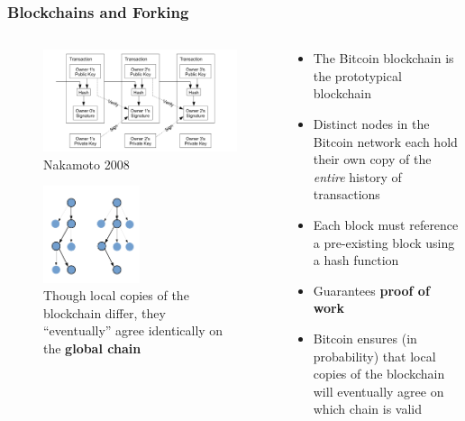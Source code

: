 \documentclass{beamer}
\begin{document}
\begin{frame}
	\frametitle{Blockchains and Forking}

	\begin{columns}{}
		\begin{column}{0.5\textwidth}
			\begin{figure}
				\centering
				\includegraphics[width=\textwidth]{nakamoto_hashes.png}
				\caption{Nakamoto 2008}
			\end{figure}

			\begin{figure}
				\centering
				\vspace{-1cm}
				\includegraphics[width=0.5\textwidth]{fork_fig.pdf}
				\caption{Though local copies of the blockchain differ,
					they ``eventually'' agree identically on the
					\textbf{global chain}}
			\end{figure}
		\end{column}

		\begin{column}{0.5\textwidth}
			\begin{itemize}
				\item The Bitcoin blockchain is the prototypical blockchain
				\item Distinct nodes in the Bitcoin network each hold their
					own copy of the \textit{entire} history of transactions
				\item Each block must reference a pre-existing block using a hash function
				\item Guarantees \textbf{proof of work}
				\item Bitcoin ensures (in probability) that local copies of the blockchain
					will eventually agree on which chain is valid
			\end{itemize}
		\end{column}
	\end{columns}
\end{frame}
\end{document}
